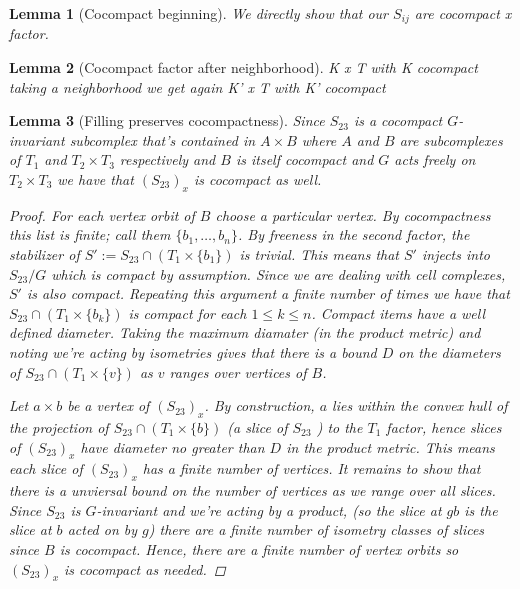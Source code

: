\documentclass{article}
\theoremstyle{mystyle}
\newtheorem{lem}{Lemma}[section]
\theoremstyle{remark}
\begin{document}
\begin{lem}
    [Cocompact beginning]
    \label{lem:cocompactfactorbeginning} 
    We directly show that our \(S_{ij}\) are cocompact x factor.

\end{lem}
\begin{lem}
    [Cocompact factor after neighborhood]
    \label{lem:cocompactfactor} 
    K x T with K cocompact taking a neighborhood we get again K' x T with K' cocompact
\end{lem}
\begin{lem} 
[Filling preserves cocompactness]
\label{lem:fillingcocompact}
    Since $S_{23}$ is a cocompact $G$-invariant subcomplex that's contained in \(A \times B\) where \(A\) and \(B\) are subcomplexes of \(T_1\) and \(T_2 \times T_3\) respectively and \(B\) is itself cocompact and $G$ acts freely on $T_2\times T_3$ we have that $(S_{23})_x$ is cocompact as well. 
\begin{proof}
     For each vertex orbit of $B$ choose a particular vertex. By cocompactness this list is finite; call them $\{b_1,\ldots,b_n\}$. By freeness in the second factor, the stabilizer of $S' := S_{23} \cap (T_1 \times \{b_1\})$ is trivial. This means that $S'$ injects into $S_{23}/G$ which is compact by assumption. Since we are dealing with cell complexes, $S'$ is also compact. Repeating this argument a finite number of times we have that $S_{23}\cap (T_1\times \{b_k\})$ is compact for each \(1 \leq k \leq n \). Compact items have a well defined diameter. Taking the maximum diamater (in the product metric) and noting we're acting by isometries gives that there is a bound \(D\) on the diameters of \(S_{23} \cap (T_1\times \{v\})\) as \(v\) ranges over vertices of \(B\). 



    Let \(a \times b\) be a vertex of \((S_{23})_x\). By construction, \(a\) lies within the convex hull of the projection of \(S_{23} \cap (T_1\times \{b\})\) (a slice of \(S_{23}\) ) to the \(T_1\) factor, hence slices of \((S_{ 23 })_x\) have diameter no greater than \(D\) in the product metric. 
    This means each slice of \((S_{23})_x\) has a finite number of vertices. It remains to show that there is a unviersal bound on the number of vertices as we range over all slices. Since \(S_{23}\) is $G$-invariant and we're acting by a product, (so the slice at \(gb\) is the slice at \(b\) acted on by \(g\)) there are a finite number of isometry classes of slices since \(B\) is cocompact. Hence, there are a finite number of vertex orbits so \((S_{23})_x\) is cocompact as needed.
\end{proof}
\end{lem}
\end{document}
